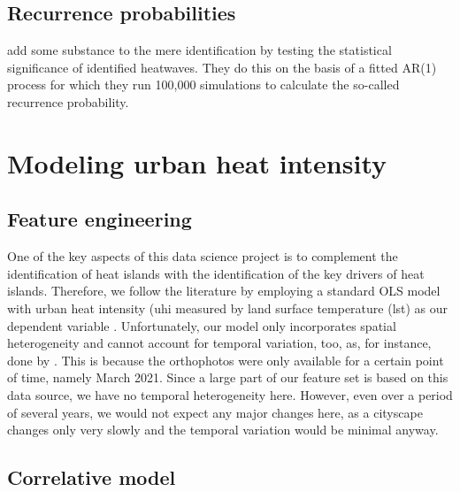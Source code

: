 \documentclass[12pt]{article}
\begin{document}
\subsection{Recurrence probabilities}

\citet{kysely2010} add some substance to the mere identification by testing the statistical significance of identified heatwaves. They do this on the basis of a fitted AR(1) process for which they run 100,000 simulations to calculate the so-called recurrence probability.

\section{Modeling urban heat intensity}

\subsection{Feature engineering}

One of the key aspects of this data science project is to complement the identification of heat islands with the identification of the key drivers of heat islands. Therefore, we follow the literature by employing a standard OLS model with urban heat intensity (\acrshort{uhi} measured by land surface temperature (\acrshort{lst}) as our dependent variable \citep{deilami2018}. Unfortunately, our model only incorporates spatial heterogeneity and cannot account for temporal variation, too, as, for instance, done by \citet{seebacher2019}. This is because the orthophotos were only available for a certain point of time, namely March 2021. Since a large part of our feature set is based on this data source, we have no temporal heterogeneity here. However, even over a period of several years, we would not expect any major changes here, as a cityscape changes only very slowly and the temporal variation would be minimal anyway. 

\subsection{Correlative model}
\end{document}
